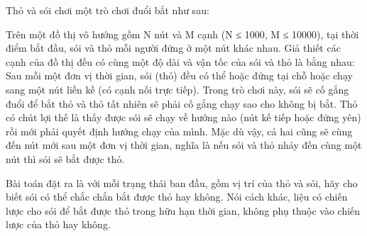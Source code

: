Thỏ và sói chơi một trò chơi đuổi bắt như sau:

Trên một đồ thị vô hướng gồm N nút và M cạnh (N ≤ 1000, M ≤ 10000), tại thời điểm bắt đầu, sói và thỏ mỗi người đứng ở một nút khác nhau. Giả thiết các cạnh của đồ thị đều có cùng một độ dài và vận tốc của sói và thỏ là bằng nhau: Sau mỗi một đơn vị thời gian, sói (thỏ) đều có thể hoặc đứng tại chỗ hoặc chạy sang một nút liền kề (có cạnh nối trực tiếp). Trong trò chơi này, sói sẽ cố gắng đuổi để bắt thỏ và thỏ tất nhiên sẽ phải cố gắng chạy sao cho không bị bắt. Thỏ có chút lợi thế là thấy được sói sẽ chạy về hướng nào (nút kế tiếp hoặc đứng yên) rồi mới phải quyết định hướng chạy của mình. Mặc dù vậy, cả hai cũng sẽ cùng đến nút mới sau một đơn vị thời gian, nghĩa là nếu sói và thỏ nhảy đến cùng một nút thì sói sẽ bắt được thỏ.

Bài toán đặt ra là với mỗi trạng thái ban đầu, gồm vị trí của thỏ và sói, hãy cho biết sói có thể chắc chắn bắt được thỏ hay không. Nói cách khác, liệu có chiến lược cho sói để bắt được thỏ trong hữu hạn thời gian, không phụ thuộc vào chiến lược của thỏ hay không.